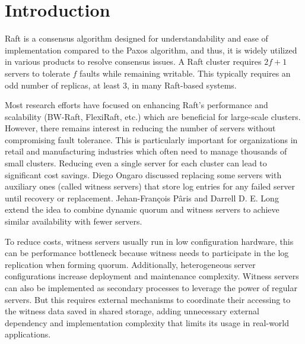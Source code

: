 \section{Introduction}\label{section:intro}
Raft is a consensus algorithm designed for understandability and ease of implementation compared to the Paxos algorithm, and thus, it is widely utilized in various products to resolve consensus issues. A Raft cluster requires $2f+1$ servers to tolerate $f$ faults while remaining writable. This typically requires an odd number of replicas, at least 3, in many Raft-based systems. 

Most research efforts have focused on enhancing Raft's performance and scalability (BW-Raft, FlexiRaft, etc.) which are beneficial for large-scale clusters. However, there remains interest in reducing the number of servers without compromising fault tolerance. This is particularly important for organizations in retail and manufacturing industries which often need to manage thousands of small clusters. Reducing even a single server for each cluster can lead to significant cost savings. Diego Ongaro discussed replacing some servers with auxiliary ones (called witness servers) that store log entries for any failed server until recovery or replacement. Jehan-François Pâris and Darrell D. E. Long extend the idea to combine dynamic quorum and witness servers to achieve similar availability with fewer servers. 

To reduce costs, witness servers usually run in low configuration hardware, this can be performance bottleneck because witness needs to participate in the log replication when forming quorum. Additionally, heterogeneous server configurations increase deployment and maintenance complexity. Witness servers can also be implemented as secondary processes to leverage the power of regular servers. But this requires external mechanisms to coordinate their accessing to the witness data saved in shared storage, adding unnecessary external dependency and implementation complexity that limits its usage in real-world applications.

